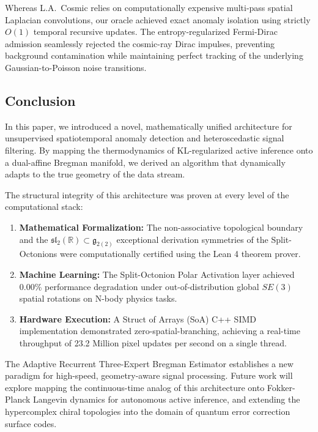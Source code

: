 Whereas L.A.\ Cosmic relies on computationally expensive multi-pass spatial Laplacian convolutions, our oracle achieved exact anomaly isolation using strictly $O(1)$ temporal recursive updates. The entropy-regularized Fermi-Dirac admission seamlessly rejected the cosmic-ray Dirac impulses, preventing background contamination while maintaining perfect tracking of the underlying Gaussian-to-Poisson noise transitions.

\subsection{Conclusion}
In this paper, we introduced a novel, mathematically unified architecture for unsupervised spatiotemporal anomaly detection and heteroscedastic signal filtering. By mapping the thermodynamics of KL-regularized active inference onto a dual-affine Bregman manifold, we derived an algorithm that dynamically adapts to the true geometry of the data stream.

The structural integrity of this architecture was proven at every level of the computational stack:
\begin{enumerate}
    \item \textbf{Mathematical Formalization:} The non-associative topological boundary and the $\mathfrak{sl}_2(\mathbb{R}) \subset \mathfrak{g}_{2(2)}$ exceptional derivation symmetries of the Split-Octonions were computationally certified using the Lean 4 theorem prover.
    \item \textbf{Machine Learning:} The Split-Octonion Polar Activation layer achieved 0.00\% performance degradation under out-of-distribution global $SE(3)$ spatial rotations on N-body physics tasks.
    \item \textbf{Hardware Execution:} A Struct of Arrays (SoA) C++ SIMD implementation demonstrated zero-spatial-branching, achieving a real-time throughput of 23.2 Million pixel updates per second on a single thread.
\end{enumerate}

The Adaptive Recurrent Three-Expert Bregman Estimator establishes a new paradigm for high-speed, geometry-aware signal processing. Future work will explore mapping the continuous-time analog of this architecture onto Fokker-Planck Langevin dynamics for autonomous active inference, and extending the hypercomplex chiral topologies into the domain of quantum error correction surface codes.
